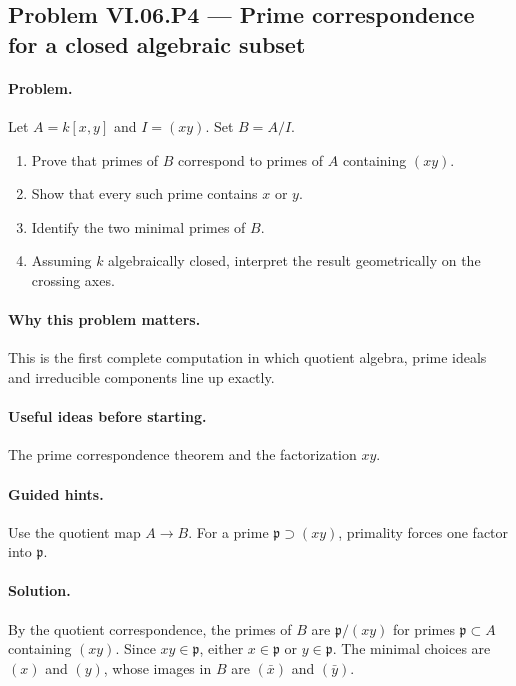 \subsection*{Problem VI.06.P4 --- Prime correspondence for a closed algebraic subset}
\label{prob:vi-06-p4}

\paragraph{Problem.}
Let \(A=k[x,y]\) and \(I=(xy)\).  Set \(B=A/I\).
\begin{enumerate}
\item Prove that primes of \(B\) correspond to primes of \(A\) containing \((xy)\).
\item Show that every such prime contains \(x\) or \(y\).
\item Identify the two minimal primes of \(B\).
\item Assuming \(k\) algebraically closed, interpret the result geometrically on the
crossing axes.
\end{enumerate}

\ifdefined\FullProblemDossiers
\paragraph{Why this problem matters.}
This is the first complete computation in which quotient algebra, prime ideals and
irreducible components line up exactly.

\paragraph{Useful ideas before starting.}
The prime correspondence theorem and the factorization \(xy\).

\paragraph{Guided hints.}
Use the quotient map \(A\to B\).  For a prime \(\mathfrak p\supset(xy)\), primality forces
one factor into \(\mathfrak p\).

\paragraph{Solution.}
By the quotient correspondence, the primes of \(B\) are \(\mathfrak p/(xy)\) for primes
\(\mathfrak p\subset A\) containing \((xy)\).  Since \(xy\in\mathfrak p\), either
\(x\in\mathfrak p\) or \(y\in\mathfrak p\).  The minimal choices are \((x)\) and \((y)\),
whose images in \(B\) are \((\bar x)\) and \((\bar y)\).

